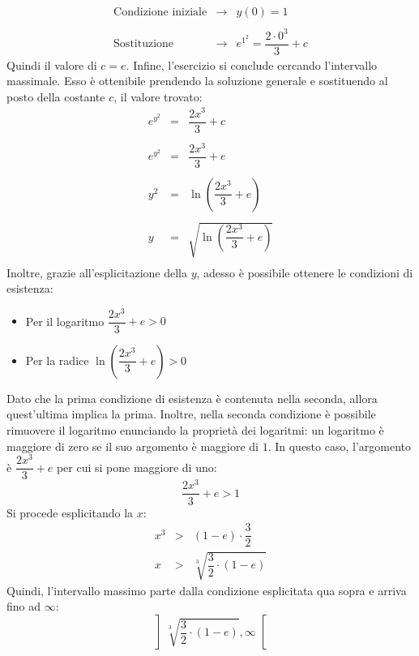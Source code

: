 \documentclass[a4paper]{article}
\begin{document}
	\begin{equation*}
		\begin{array}{rcl}
			\text{Condizione iniziale} 	&\longrightarrow& y\left(0\right) = 1 \\
			\\
			\text{Sostituzione}			&\longrightarrow& e^{1^{2}} = \dfrac{2 \cdot 0^{3}}{3} + c
		\end{array}
	\end{equation*}
	Quindi il valore di $c = e$. Infine, l'esercizio si conclude cercando l'intervallo massimale. Esso è ottenibile prendendo la soluzione generale e sostituendo al posto della costante $c$, il valore trovato:
	\begin{equation*}
		\begin{array}{rcl}
			e^{y^{2}} &=& \dfrac{2x^{3}}{3} + c \\
			\\
			e^{y^{2}} &=& \dfrac{2x^{3}}{3} + e \\
			\\
			y^{2} &=& \ln\left(\dfrac{2x^{3}}{3} + e\right) \\
			\\
			y &=& \sqrt{\ln\left(\dfrac{2x^{3}}{3} + e\right)} \\
		\end{array}
	\end{equation*}
	Inoltre, grazie all'esplicitazione della $y$, adesso è possibile ottenere le condizioni di esistenza:
	\begin{itemize}
		\item Per il logaritmo $\dfrac{2x^{3}}{3} + e > 0$
		\item Per la radice $\ln\left(\dfrac{2x^{3}}{3} + e\right) > 0$
	\end{itemize}
	Dato che la prima condizione di esistenza è contenuta nella seconda, allora quest'ultima implica la prima. Inoltre, nella seconda condizione è possibile rimuovere il logaritmo enunciando la proprietà dei logaritmi: un logaritmo è maggiore di zero se il suo argomento è maggiore di $1$. In questo caso, l'argomento è $\dfrac{2x^{3}}{3} + e$ per cui si pone maggiore di uno:
	\begin{equation*}
		\dfrac{2x^{3}}{3} + e > 1
	\end{equation*}
	Si procede esplicitando la $x$:
	\begin{equation*}
		\begin{array}{rcl}
			x^{3} &>& \left(1-e\right) \cdot \dfrac{3}{2} \\ [.5em]
			x &>& \sqrt[3]{\dfrac{3}{2} \cdot \left(1-e\right)}
		\end{array}
	\end{equation*}
	Quindi, l'intervallo massimo parte dalla condizione esplicitata qua sopra e arriva fino ad $\infty$:
	\begin{equation*}
		\left] \sqrt[3]{\dfrac{3}{2} \cdot \left(1-e\right)}, \infty \right[
	\end{equation*}\newpage
\end{document}
